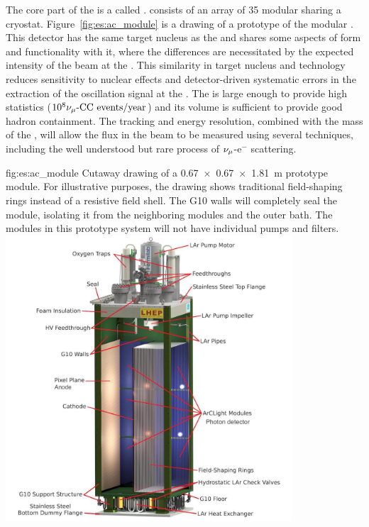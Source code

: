 The core part of the   is a  called .  
 consists of an array of 35 modular  sharing a cryostat.  Figure~\ref{fig:es:ac_module} is a  drawing of a prototype of the modular .  
This detector has the same target nucleus as the  and shares some aspects of form and functionality with it, where the differences are necessitated by the expected intensity of the beam at the .  This similarity in target nucleus and technology reduces sensitivity to nuclear effects and detector-driven systematic errors in the extraction of the oscillation signal at the  .  The  is large enough to provide high statistics 
($\num{e8}{\numu \text{-CC events/year}}$) and its volume  is sufficient to provide good hadron containment.  The tracking and energy resolution, combined with the mass of the , will allow the flux in the beam to be measured using several techniques, including the well understood but rare process of $\nu_\mu$-e$^{-}$ scattering.

\begin{dunefigure}{fig:es:ac_module}
{Cutaway drawing of a \SI{0.67 x 0.67 x 1.81}{\metre}  prototype module. For illustrative purposes, the drawing shows traditional field-shaping rings instead of a resistive field shell. The G10 walls will completely seal the module, isolating it from the neighboring modules and the outer  bath. The modules in this prototype system will not have individual pumps and filters.}
\includegraphics[width=0.8\textwidth]{graphics/Normal-Module-4K_labelled.jpeg}
\end{dunefigure}

